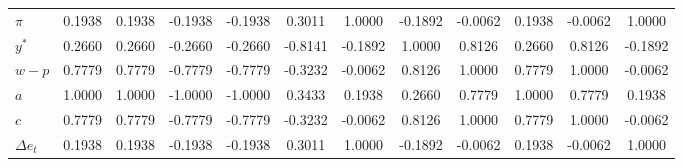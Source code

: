\begin{center}
\begin{longtable}{lccccccccccc}
${\pi}       $	 & 	        0.1938	 & 	        0.1938	 & 	       -0.1938	 & 	       -0.1938	 & 	        0.3011	 & 	        1.0000	 & 	       -0.1892	 & 	       -0.0062	 & 	        0.1938	 & 	       -0.0062	 & 	        1.0000 \\ 
${y^*}       $	 & 	        0.2660	 & 	        0.2660	 & 	       -0.2660	 & 	       -0.2660	 & 	       -0.8141	 & 	       -0.1892	 & 	        1.0000	 & 	        0.8126	 & 	        0.2660	 & 	        0.8126	 & 	       -0.1892 \\ 
${w-p}       $	 & 	        0.7779	 & 	        0.7779	 & 	       -0.7779	 & 	       -0.7779	 & 	       -0.3232	 & 	       -0.0062	 & 	        0.8126	 & 	        1.0000	 & 	        0.7779	 & 	        1.0000	 & 	       -0.0062 \\ 
$a           $	 & 	        1.0000	 & 	        1.0000	 & 	       -1.0000	 & 	       -1.0000	 & 	        0.3433	 & 	        0.1938	 & 	        0.2660	 & 	        0.7779	 & 	        1.0000	 & 	        0.7779	 & 	        0.1938 \\ 
$c           $	 & 	        0.7779	 & 	        0.7779	 & 	       -0.7779	 & 	       -0.7779	 & 	       -0.3232	 & 	       -0.0062	 & 	        0.8126	 & 	        1.0000	 & 	        0.7779	 & 	        1.0000	 & 	       -0.0062 \\ 
$\Delta e_t  $	 & 	        0.1938	 & 	        0.1938	 & 	       -0.1938	 & 	       -0.1938	 & 	        0.3011	 & 	        1.0000	 & 	       -0.1892	 & 	       -0.0062	 & 	        0.1938	 & 	       -0.0062	 & 	        1.0000 \\ 
\end{longtable}
 \end{center}
